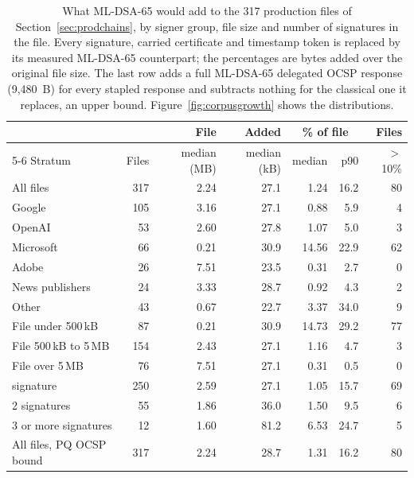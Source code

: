 \begin{table}[t]
\caption{What ML-DSA-65 would add to the 317 production files of Section~\ref{sec:prodchains}, by signer group, file size and number of signatures in the file. Every signature, carried certificate and timestamp token is replaced by its measured ML-DSA-65 counterpart; the percentages are bytes added over the original file size. The last row adds a full ML-DSA-65 delegated OCSP response (9,480~B) for every stapled response and subtracts nothing for the classical one it replaces, an upper bound. Figure~\ref{fig:corpusgrowth} shows the distributions.}
\label{tab:corpusstrata}
\small
\setlength{\tabcolsep}{4pt}
\begin{tabular}{lrrrrrr}
\toprule
 & & File & Added & \multicolumn{2}{c}{\% of file} & Files\\
\cmidrule(lr){5-6}
Stratum & Files & median (MB) & median (kB) & median & p90 & $>$10\%\\
\midrule
All files & 317 & 2.24 & 27.1 & 1.24 & 16.2 & 80\\
\addlinespace
Google & 105 & 3.16 & 27.1 & 0.88 & 5.9 & 4\\
OpenAI & 53 & 2.60 & 27.8 & 1.07 & 5.0 & 3\\
Microsoft & 66 & 0.21 & 30.9 & 14.56 & 22.9 & 62\\
Adobe & 26 & 7.51 & 23.5 & 0.31 & 2.7 & 0\\
News publishers & 24 & 3.33 & 28.7 & 0.92 & 4.3 & 2\\
Other & 43 & 0.67 & 22.7 & 3.37 & 34.0 & 9\\
\addlinespace
File under 500\,kB & 87 & 0.21 & 30.9 & 14.73 & 29.2 & 77\\
File 500\,kB to 5\,MB & 154 & 2.43 & 27.1 & 1.16 & 4.7 & 3\\
File over 5\,MB & 76 & 7.51 & 27.1 & 0.31 & 0.5 & 0\\
\addlinespace
1 signature & 250 & 2.59 & 27.1 & 1.05 & 15.7 & 69\\
2 signatures & 55 & 1.86 & 36.0 & 1.50 & 9.5 & 6\\
3 or more signatures & 12 & 1.60 & 81.2 & 6.53 & 24.7 & 5\\
\addlinespace
All files, PQ OCSP bound & 317 & 2.24 & 28.7 & 1.31 & 16.2 & 80\\
\bottomrule
\end{tabular}
\end{table}
